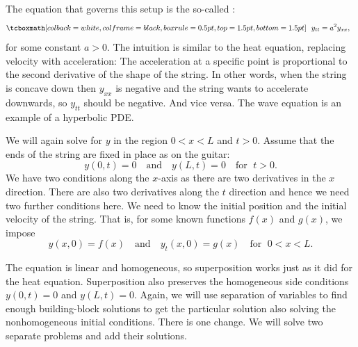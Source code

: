 \begin{myfig}
\capstart
{}
\caption{Vibrating string of length $L$, $x$ is position, $y$ is displacement.\label{we:vibstrfig}}
\end{myfig}

The equation that governs this setup is the so-called
\emph{}:
\begin{equation*}
\mybxbg{~~
y_{tt} =
a^2 y_{xx} ,
~~}
\end{equation*}
for some constant $a > 0$.
The intuition is similar to the heat equation, replacing velocity with
acceleration: The acceleration at a specific point is proportional to the second
derivative of the shape of the string.  In other words,
when the string is
concave down then $y_{xx}$ is negative and the string wants to accelerate
downwards, so $y_{tt}$ should be negative.  And vice versa.
The wave equation is an example of a hyperbolic PDE\@.

We will again solve for $y$ in the region $0 < x < L$ and $t > 0$.
Assume that the ends of the string are fixed in place as on the guitar:
\begin{equation*}
y(0,t) = 0 \quad \text{and} \quad y(L,t) = 0 \quad \text{for } \; t > 0.
\end{equation*}
We have two conditions along the $x$-axis as there are
two derivatives in the $x$ direction.
There are also two derivatives along the $t$ direction and hence we need
two further conditions here.  We need to know the initial position
and the initial velocity of the string.  That is,
for some known functions $f(x)$ and $g(x)$, we impose
\begin{equation*}
y(x,0) = f(x)  \quad \text{and} \quad y_t (x,0) = g(x)
\quad \text{for } \; 0 < x < L .
\end{equation*}

The equation is linear and homogeneous,
so superposition works just as it did for the
heat equation.
Superposition also preserves the homogeneous 
side conditions $y(0,t)=0$ and $y(L,t)=0$.
Again, we will use separation of variables to find
enough building-block solutions to get the particular solution
also solving the nonhomogeneous initial conditions.  There is
one change.  We will solve two separate problems
and add their solutions.

